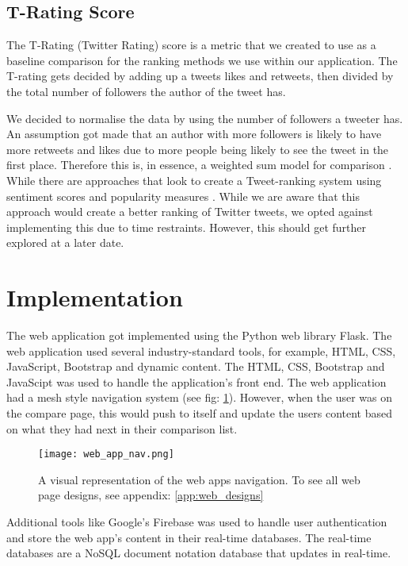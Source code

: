 	\subsection{T-Rating Score}
		The T-Rating (Twitter Rating) score is a metric that we created to use as a baseline comparison for the ranking methods we use within our application. The T-rating gets decided by adding up a tweets likes and retweets, then divided by the total number of followers the author of the tweet has. 
		
		We decided to normalise the data by using the number of followers a tweeter has. An assumption got made that an author with more followers is likely to have more retweets and likes due to more people being likely to see the tweet in the first place. Therefore this is, in essence, a weighted sum model for comparison \cite{churchman1954approximate}. While there are approaches that look to create a Tweet-ranking system using sentiment scores and popularity measures \cite{aleidi2019tweet}. While we are aware that this approach would create a better ranking of Twitter tweets, we opted against implementing this due to time restraints. However, this should get further explored at a later date.
	
	
	\section{Implementation}
	
	The web application got implemented using the Python web library Flask. The web application used several industry-standard tools, for example, HTML, CSS, JavaScript, Bootstrap and dynamic content. The HTML, CSS, Bootstrap and JavaScipt was used to handle the application's front end. The web application had a mesh style navigation system (see fig: \ref{fig:web_app_nav}). However, when the user was on the compare page, this would push to itself and update the users content based on what they had next in their comparison list.
	
	\begin{figure}[t]
		\centering
		\texttt{[image: web\_app\_nav.png]}
		\caption{A visual representation of the web apps navigation. To see all web page designs, see appendix: \ref{app:web_designs}}
		\label{fig:web_app_nav}
		
	\end{figure}
	
	Additional tools like Google's Firebase \cite{moroney2017firebase} was used to handle user authentication and store the web app's content in their real-time databases. The real-time databases are a NoSQL document notation database that updates in real-time. 
	
